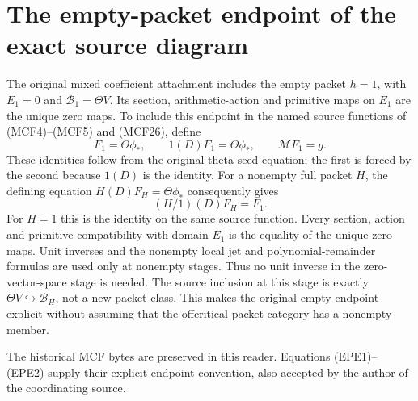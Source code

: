 \section{The empty-packet endpoint of the exact source diagram}
\label{CFStage:sec:EPE}
The original mixed coefficient attachment includes the empty packet
$h=1$, with $E_1=0$ and $\mathscr B_1=\Theta V$. Its section,
arithmetic-action and primitive maps on $E_1$ are the unique zero maps.
To include this endpoint in the named source functions of
(MCF4)--(MCF5) and (MCF26), define
\[
 F_1=\Theta\phi_*,\qquad 1(D)F_1=\Theta\phi_*,\qquad
 \mathcal MF_1=g.
 \tag{EPE1}
\]
These identities follow from the original theta seed equation; the
first is forced by the second because $1(D)$ is the identity.
For a nonempty full packet $H$, the defining equation
$H(D)F_H=\Theta\phi_*$ consequently gives
\[
 (H/1)(D)F_H=F_1.
 \tag{EPE2}
\]
For $H=1$ this is the identity on the same source function.
Every section, action and primitive compatibility with domain $E_1$
is the equality of the unique zero maps. Unit inverses and the
nonempty local jet and polynomial-remainder formulas are used only
at nonempty stages. Thus no unit inverse in the zero-vector-space
stage is needed. The source inclusion at this stage is exactly
$\Theta V\hookrightarrow\mathscr B_H$, not a new packet class.
This makes the original empty endpoint explicit without assuming
that the offcritical packet category has a nonempty member.

The historical MCF bytes are preserved in this reader. Equations
(EPE1)--(EPE2) supply their explicit endpoint convention, also
accepted by the author of the coordinating source.

